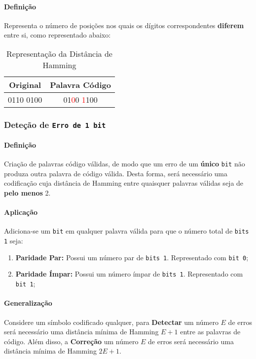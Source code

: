 \documentclass{article}
\begin{document}
            \paragraph{Definição}Representa o número de posições nos quais os dígitos correspondentes \textbf{diferem} entre si, como representado abaixo:
                \begin{table}[H]
                    \centering
                    \begin{tabular}[]{cc}\hline
                        Original  & Palavra Código\\\hline
                        0110 0100 & 01\textcolor{red}{0}0 \textcolor{red}{1}100\\\hline
                    \end{tabular}
                    \caption{Representação da Distância de Hamming}\label{table:HammingDefinition}
                \end{table}\noindent

        \subsubsection{Deteção de \texttt{Erro de 1 bit}}
            \paragraph{Definição}Criação de palavras código válidas, de modo que um erro de um \textbf{único} \texttt{bit} não produza outra palavra de código válida. Desta forma, será necessário uma codificação cuja distância de Hamming entre quaisquer palavras válidas seja de \textbf{pelo menos} 2.

            \paragraph{Aplicação}Adiciona-se um \texttt{bit} em qualquer palavra válida para que o número total de \texttt{bits 1} seja:
                \begin{enumerate}[noitemsep, rightmargin = \leftmargin]
                    \item \textbf{Paridade Par:} Possui um número par de \texttt{bits 1}. Representado com \texttt{bit 0};
                    \item \textbf{Paridade Ímpar:} Possui um número ímpar de \texttt{bits 1}. Representado com \texttt{bit 1};
                \end{enumerate}

            \paragraph{Generalização}Considere um símbolo codificado qualquer, para \textbf{Detectar} um número $E$ de erros será necessário uma distância mínima de Hamming $E+1$ entre as palavras de código. Além disso, a \textbf{Correção} um número $E$ de erros será necessário uma distância mínima de Hamming $2E+1$.
\end{document}
